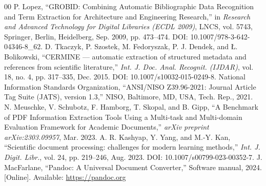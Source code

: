 \documentclass[conference]{IEEEtran}
\begin{document}
\begin{thebibliography}{00}
 P. Lopez, ``GROBID: Combining Automatic Bibliographic Data Recognition and Term Extraction for Architecture and Engineering Research,'' in \textit{Research and Advanced Technology for Digital Libraries (ECDL 2009)}, LNCS, vol. 5743, Springer, Berlin, Heidelberg, Sep. 2009, pp. 473--474. DOI: 10.1007/978-3-642-04346-8\_62.
 D. Tkaczyk, P. Szostek, M. Fedoryszak, P. J. Dendek, and \L. Bolikowski, ``CERMINE --- automatic extraction of structured metadata and references from scientific literature,'' \textit{Int. J. Doc. Anal. Recognit. (IJDAR)}, vol. 18, no. 4, pp. 317--335, Dec. 2015. DOI: 10.1007/s10032-015-0249-8.
 National Information Standards Organization, ``ANSI/NISO Z39.96-2021: Journal Article Tag Suite (JATS), version 1.3,'' NISO, Baltimore, MD, USA, Tech. Rep., 2021.
 N. Meuschke, V. Schubotz, F. Hamborg, T. Skopal, and B. Gipp, ``A Benchmark of PDF Information Extraction Tools Using a Multi-task and Multi-domain Evaluation Framework for Academic Documents,'' \textit{arXiv preprint arXiv:2303.09957}, Mar. 2023.
 A. R. Kashyap, Y. Yang, and M.-Y. Kan, ``Scientific document processing: challenges for modern learning methods,'' \textit{Int. J. Digit. Libr.}, vol. 24, pp. 219--246, Aug. 2023. DOI: 10.1007/s00799-023-00352-7.
 J. MacFarlane, ``Pandoc: A Universal Document Converter,'' Software manual, 2024. [Online]. Available: \url{https://pandoc.org}
\end{thebibliography}
\end{document}
